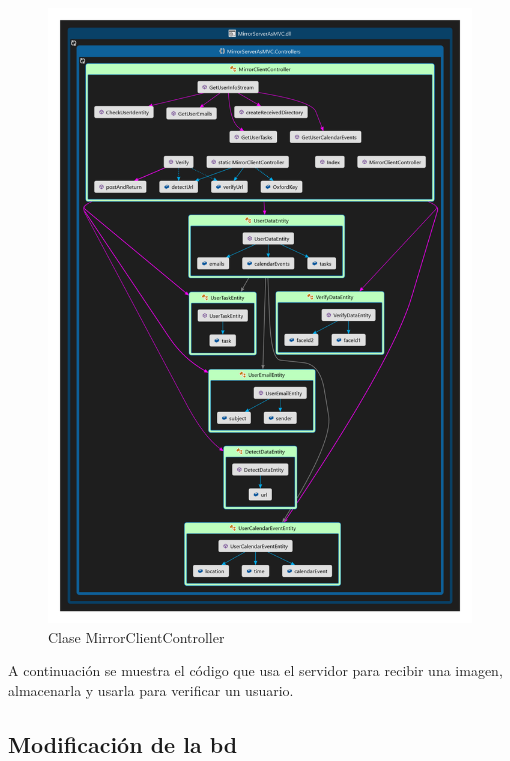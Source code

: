 \begin{figure}[!htbp]
	\centering
	\includegraphics[angle=0, scale=1.0]{fig/MirrorClientController}
	\caption{Clase MirrorClientController}
\end{figure}

\FloatBarrier

A continuación se muestra el código que usa el servidor para recibir una imagen, almacenarla y usarla para verificar un usuario.



\subsection{Modificación de la \acrshort{bd}}


